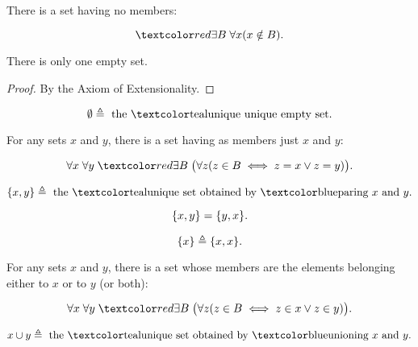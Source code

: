 \begin{frame}{}
  \begin{axiom}
    There is a set having no members:

    \[
      \red{\exists B}\; \forall x (x \notin B).
    \]
  \end{axiom}

  \pause
  \begin{theorem}
    There is only one empty set.
  \end{theorem}

  \pause
  \begin{proof}
    By the Axiom of Extensionality.
  \end{proof}

  \pause
  \begin{definition}[$\emptyset$]
    \[
      \emptyset \triangleq \text{ the \teal{unique} unique empty set}.
    \]
  \end{definition}
\end{frame}

\begin{frame}{}
  \begin{axiom}
    For any sets $x$ and $y$, there is a set having as members just $x$ and $y$:

    \[
      \forall x\; \forall y\; \red{\exists B}\; \big(\forall z (z \in B \iff z = x \lor z = y)\big).
    \]
  \end{axiom}

  \pause
  \begin{definition}[``$\set{x, y}$'']
    \[
      \set{x, y} \triangleq \text{ the \teal{unique} set obtained by \blue{paring} } x \text{ and } y.
    \]
  \end{definition}

  \pause
  \begin{theorem}
    \[
      \{x, y\} = \{y, x\}.
    \]
  \end{theorem}

  \pause
  \begin{definition}[$\set{x}$]
    \[
      \{x\} \triangleq \{x, x\}.
    \]
  \end{definition}
\end{frame}

\begin{frame}{}
  \begin{axiom}
    For any sets $x$ and $y$, there is a set whose members are
    the elements belonging either to $x$ or to $y$ (or both):

    \[
      \forall x\; \forall y\; \red{\exists B}\; \big(\forall z (z \in B \iff z \in x \lor z \in y)\big).
    \]
  \end{axiom}

  \pause
  \begin{definition}[$x \cup y$]
    \[
      x \cup y \triangleq \text{ the \teal{unique} set obtained by \blue{unioning} } x \text{ and } y.
    \]
  \end{definition}
\end{frame}

